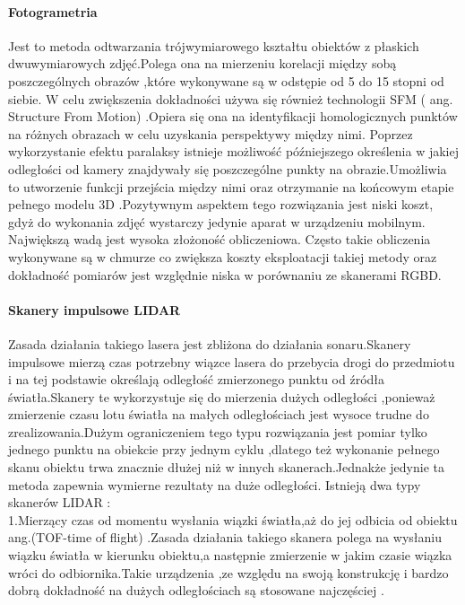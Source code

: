 \documentclass[12pt]{article}
\begin{document}
\paragraph{Fotogrametria\newline}

Jest to metoda odtwarzania trójwymiarowego kształtu obiektów z płaskich dwuwymiarowych zdjęć.Polega ona na mierzeniu korelacji między sobą poszczególnych obrazów ,które wykonywane są w odstępie od 5 do 15 stopni od siebie. W celu zwiększenia dokładności używa się również technologii SFM ( ang. Structure From Motion) .Opiera się ona na identyfikacji homologicznych punktów na różnych obrazach w celu uzyskania perspektywy między nimi. Poprzez wykorzystanie efektu paralaksy istnieje możliwość późniejszego określenia w jakiej odległości od kamery znajdywały się poszczególne punkty na obrazie.Umożliwia to utworzenie funkcji przejścia między nimi oraz otrzymanie na końcowym etapie pełnego modelu 3D \cite{glowienka2015fotogrametria} .Pozytywnym aspektem tego rozwiązania jest niski koszt, gdyż do wykonania zdjęć wystarczy jedynie aparat w urządzeniu mobilnym. Największą wadą jest wysoka złożoność obliczeniowa. Często takie obliczenia wykonywane są w chmurze co zwiększa koszty eksploatacji takiej metody oraz dokładność pomiarów jest względnie niska w porównaniu ze skanerami RGBD.

\paragraph{Skanery impulsowe LIDAR\newline}

Zasada działania takiego lasera jest zbliżona do działania sonaru.Skanery impulsowe mierzą czas potrzebny wiązce lasera do przebycia drogi do przedmiotu i na tej podstawie określają odległość zmierzonego punktu od  źródła światła.Skanery te wykorzystuje się do mierzenia dużych odległości ,ponieważ zmierzenie czasu lotu światła na małych odległościach jest wysoce trudne do zrealizowania.Dużym ograniczeniem tego typu rozwiązania jest pomiar tylko jednego punktu na obiekcie przy jednym cyklu ,dlatego też wykonanie pełnego skanu obiektu trwa znacznie dłużej niż w innych skanerach.Jednakże jedynie ta metoda zapewnia wymierne rezultaty na duże odległości.
\newline
Istnieją dwa typy skanerów LIDAR \cite{wehr1999airborne}:\\
1.Mierzący czas od momentu wysłania wiązki światła,aż do jej odbicia od obiektu ang.(TOF-time of flight) .Zasada działania takiego skanera polega na wysłaniu wiązku światła w kierunku obiektu,a następnie zmierzenie w jakim czasie wiązka wróci do odbiornika.Takie urządzenia ,ze względu na swoją konstrukcję i bardzo dobrą dokładność na dużych odległościach są stosowane najczęściej \cite{introToLidar}.
\end{document}
